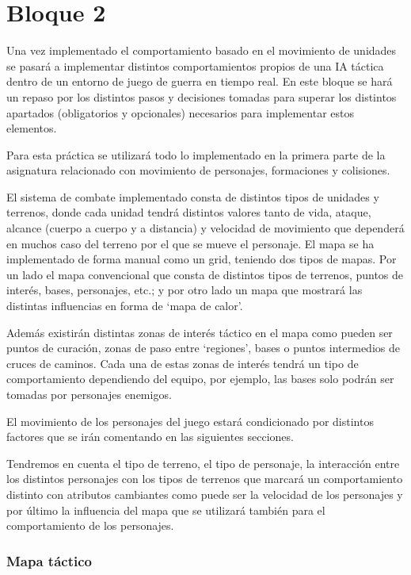 \part{Bloque 2}

 Una vez implementado el comportamiento basado  en el movimiento de unidades se pasará a implementar distintos comportamientos propios de una IA táctica dentro de un entorno de juego de guerra en tiempo real.  En este bloque se hará un repaso por los distintos pasos y decisiones tomadas para superar los distintos apartados (obligatorios y opcionales) necesarios para implementar estos elementos.

Para esta práctica se utilizará todo lo implementado en la primera parte de la asignatura relacionado con movimiento de personajes, formaciones y colisiones.

El sistema de combate implementado consta de distintos tipos de unidades y terrenos, donde cada unidad tendrá distintos valores tanto de vida, ataque, alcance (cuerpo a cuerpo y a distancia) y velocidad de movimiento que dependerá en muchos caso del terreno por el que se mueve el personaje. El mapa se ha implementado de forma manual como un grid, teniendo dos tipos de mapas. Por un lado el mapa convencional que consta de distintos tipos de terrenos, puntos de interés, bases, personajes, etc.; y por otro lado un mapa que mostrará las distintas influencias en forma de `mapa de calor'.

Además  existirán distintas zonas de interés táctico en el mapa como pueden ser puntos de curación, zonas de paso entre `regiones', bases o puntos intermedios de cruces de caminos. Cada una de estas zonas de interés tendrá un tipo de comportamiento dependiendo del equipo, por ejemplo, las bases solo podrán ser tomadas por personajes enemigos.

El movimiento de los personajes del juego estará condicionado por distintos factores que se irán comentando en las siguientes secciones.

Tendremos en cuenta el tipo de terreno, el tipo de personaje, la interacción entre los distintos personajes con los tipos de terrenos que marcará un comportamiento distinto con atributos cambiantes como puede ser la velocidad de los personajes y por último la influencia del mapa que se utilizará también para el comportamiento de los personajes.

\section{Mapa táctico}

